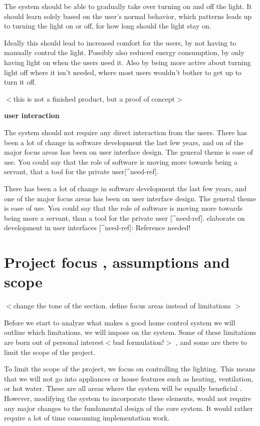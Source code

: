 The system should be able to gradually take over turning on and off the light. It should learn solely based on the user's normal behavior, which patterns leads up to turning the light on or off, for how long should the light stay on. 

Ideally this should lead to increased comfort for the users, by not having to manually control the light. Possibly also reduced energy consumption, by only having light on when the users need it. Also by being more active about turning light off where it isn't needed, where most users wouldn't bother to get up to turn it off.

$<$this is not a finished product, but a proof of concept$>$




\textbf{user interaction}

The system should not require any direct interaction from the users. There has been a lot of change in software development the last few years, and on of the major focus areas has been on user interface design. The general theme is ease of use. You could say that the role of software is moving more towards being a servant, that a tool for the private user[\^{}need-ref].


There has been a lot of change in software development the last few years, and one of the major focus areas has been on user interface design. The general theme is ease of use. You could say that the role of software is moving more towards being more a servant, than a tool for the private user [\^{}need-ref]. elaborate on development in user interfaces [\^{}need-ref]: Reference needed!

\section{Project focus , assumptions and scope}
\label{projectfocusassumptionsandscope}

$<$change the tone of the section. define focus areas instead of limitations $>$

Before we start to analyze what makes a good home control system we will outline which limitations, we will impose on the system. Some of these limitations are born out of personal interest$<$bad formulation!$>$ , and some are there to limit the scope of the project. 

To limit the scope of the project, we focus on controlling the lighting. This means that we will not go into appliances or house features such as heating, ventilation, or hot water. These are all areas where the system will be equally beneficial . However, modifying the system to incorporate these elements, would not require any major changes to the fundamental design of the core system. It would rather require a lot of time consuming implementation work. 

